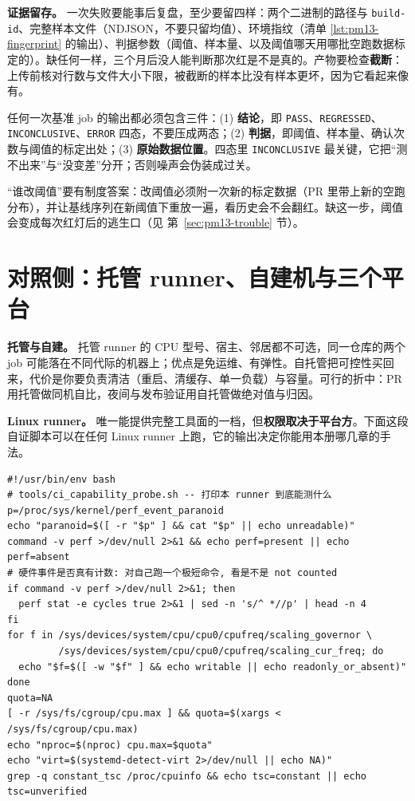 \documentclass[12pt,a4paper,fontset=fandol]{ctexbook}
\newcommand{\Tp}[1]{\texttt{#1}}
\begin{document}
\textbf{证据留存。} 一次失败要能事后复盘，至少要留四样：两个二进制的路径与 \Tp{build-id}、完整样本文件（NDJSON，不要只留均值）、环境指纹（清单 \ref{lst:pm13-fingerprint} 的输出）、判据参数（阈值、样本量、以及阈值哪天用哪批空跑数据标定的）。缺任何一样，三个月后没人能判断那次红是不是真的。产物要检查\textbf{截断}：上传前核对行数与文件大小下限，被截断的样本比没有样本更坏，因为它看起来像有。

\begin{bestpractice}[title={门禁输出的三件套}]
\label{box:pm13-three}
任何一次基准 job 的输出都必须包含三件：(1) \textbf{结论}，即 \Tp{PASS}、\Tp{REGRESSED}、\Tp{INCONCLUSIVE}、\Tp{ERROR} 四态，不要压成两态；(2) \textbf{判据}，即阈值、样本量、确认次数与阈值的标定出处；(3) \textbf{原始数据位置}。四态里 \Tp{INCONCLUSIVE} 最关键，它把``测不出来''与``没变差''分开；否则噪声会伪装成过关。
\end{bestpractice}

``谁改阈值''要有制度答案：改阈值必须附一次新的标定数据（PR 里带上新的空跑分布），并让基线序列在新阈值下重放一遍，看历史会不会翻红。缺这一步，阈值会变成每次红灯后的逃生口（见 第~\ref{sec:pm13-trouble} 节）。

\section{对照侧：托管 runner、自建机与三个平台}
\label{sec:pm13-platforms}

\textbf{托管与自建。} 托管 runner 的 CPU 型号、宿主、邻居都不可选，同一仓库的两个 job 可能落在不同代际的机器上；优点是免运维、有弹性。自托管把可控性买回来，代价是你要负责清洁（重启、清缓存、单一负载）与容量。可行的折中：PR 用托管做同机自比，夜间与发布验证用自托管做绝对值与归因。

\textbf{Linux runner。} 唯一能提供完整工具面的一档，但\textbf{权限取决于平台方}。下面这段自证脚本可以在任何 Linux runner 上跑，它的输出决定你能用本册哪几章的手法。

\begin{lstlisting}[style=shellstyle, caption={CI 上的能力自证（Linux）：逐条探测, 而不是引用
别人的结论。每一行对应本册某一章的前置条件}, label={lst:pm13-probe}]
#!/usr/bin/env bash
# tools/ci_capability_probe.sh -- 打印本 runner 到底能测什么
p=/proc/sys/kernel/perf_event_paranoid
echo "paranoid=$([ -r "$p" ] && cat "$p" || echo unreadable)"
command -v perf >/dev/null 2>&1 && echo perf=present || echo perf=absent
# 硬件事件是否真有计数: 对自己跑一个极短命令, 看是不是 not counted
if command -v perf >/dev/null 2>&1; then
  perf stat -e cycles true 2>&1 | sed -n 's/^ *//p' | head -n 4
fi
for f in /sys/devices/system/cpu/cpu0/cpufreq/scaling_governor \
         /sys/devices/system/cpu/cpu0/cpufreq/scaling_cur_freq; do
  echo "$f=$([ -w "$f" ] && echo writable || echo readonly_or_absent)"
done
quota=NA
[ -r /sys/fs/cgroup/cpu.max ] && quota=$(xargs < /sys/fs/cgroup/cpu.max)
echo "nproc=$(nproc) cpu.max=$quota"
echo "virt=$(systemd-detect-virt 2>/dev/null || echo NA)"
grep -q constant_tsc /proc/cpuinfo && echo tsc=constant || echo tsc=unverified
\end{lstlisting}
\end{document}

